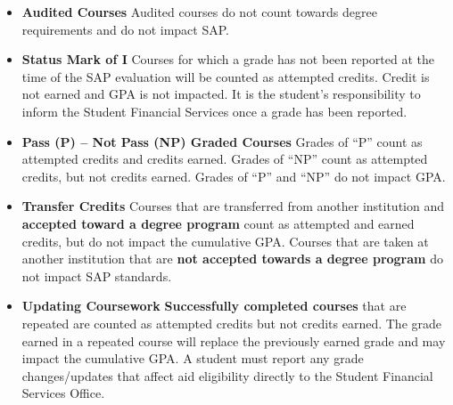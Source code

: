\documentclass[
  letterpaper,
]{scrbook}
\begin{document}
\begin{itemize}
\item
  \textbf{Audited Courses} Audited courses do not count towards degree
  requirements and do not impact SAP.
\item
  \textbf{Status Mark of I} Courses for which a grade has not been
  reported at the time of the SAP evaluation will be counted as
  attempted credits. Credit is not earned and GPA is not impacted. It is
  the student's responsibility to inform the Student Financial Services
  once a grade has been reported.
\item
  \textbf{Pass (P) -- Not Pass (NP) Graded Courses} Grades of ``P''
  count as attempted credits and credits earned. Grades of ``NP'' count
  as attempted credits, but not credits earned. Grades of ``P'' and
  ``NP'' do not impact GPA.
\item
  \textbf{Transfer Credits} Courses that are transferred from another
  institution and \textbf{accepted toward a degree program} count as
  attempted and earned credits, but do not impact the cumulative GPA.
  Courses that are taken at another institution that are \textbf{not
  accepted towards a degree program} do not impact SAP standards.
\item
  \textbf{Updating Coursework} \textbf{Successfully completed courses}
  that are repeated are counted as attempted credits but not credits
  earned. The grade earned in a repeated course will replace the
  previously earned grade and may impact the cumulative GPA. A student
  must report any grade changes/updates that affect aid eligibility
  directly to the Student Financial Services Office.


\end{itemize}
\end{document}

